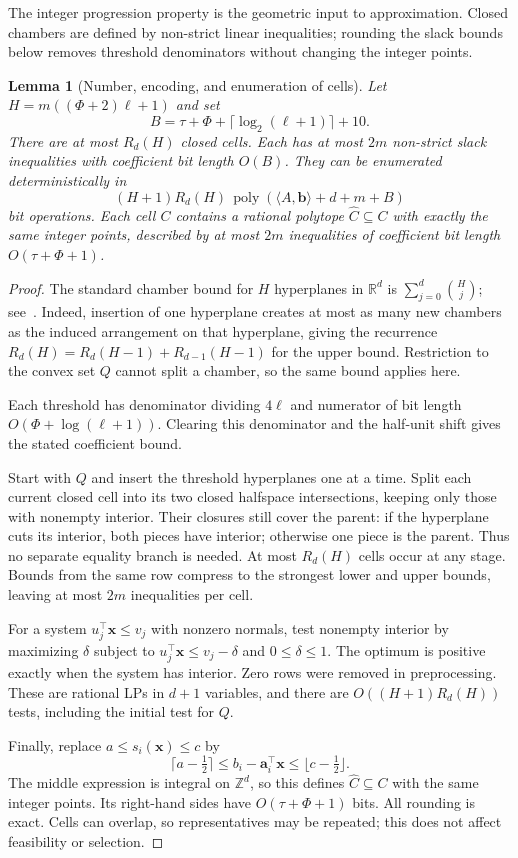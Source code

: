 \documentclass[11pt]{article}
\newtheorem{lemma}[theorem]{Lemma}
\theoremstyle{definition}\newtheorem{definition}{Definition}[section]
\theoremstyle{remark}\newtheorem{remark}[theorem]{Remark}
\newcommand{\R}{\mathbb R}\newcommand{\Q}{\mathbb Q}\newcommand{\Z}{\mathbb Z}
\newcommand{\poly}{\operatorname{poly}}
\begin{document}
The integer progression property is the geometric input to approximation. Closed chambers are defined by non-strict linear inequalities; rounding the slack bounds below removes threshold denominators without changing the integer points.

\begin{lemma}[Number, encoding, and enumeration of cells]\label{lem:arrangement}
Let $H=m((\Phi+2)\ell+1)$ and set
\[
 B=\tau+\Phi+\lceil\log_2(\ell+1)\rceil+10.
\]
There are at most $R_d(H)$ closed cells. Each has at most $2m$ non-strict slack inequalities with coefficient bit length $O(B)$. They can be enumerated deterministically in
\begin{equation}\label{eq:arrangement-time}
 (H+1)R_d(H)\,\poly(\langle A,\mathbf b\rangle+d+m+B)
\end{equation}
bit operations. Each cell $C$ contains a rational polytope $\widehat C\subseteq C$ with exactly the same integer points, described by at most $2m$ inequalities of coefficient bit length $O(\tau+\Phi+1)$.
\end{lemma}
\begin{proof}
The standard chamber bound for $H$ hyperplanes in $\R^d$ is $\sum_{j=0}^d\binom Hj$; see~\cite{Stanley}. Indeed, insertion of one hyperplane creates at most as many new chambers as the induced arrangement on that hyperplane, giving the recurrence $R_d(H)=R_d(H-1)+R_{d-1}(H-1)$ for the upper bound. Restriction to the convex set $Q$ cannot split a chamber, so the same bound applies here.

Each threshold has denominator dividing $4\ell$ and numerator of bit length $O(\Phi+\log(\ell+1))$. Clearing this denominator and the half-unit shift gives the stated coefficient bound.

Start with $Q$ and insert the threshold hyperplanes one at a time. Split each current closed cell into its two closed halfspace intersections, keeping only those with nonempty interior. Their closures still cover the parent: if the hyperplane cuts its interior, both pieces have interior; otherwise one piece is the parent. Thus no separate equality branch is needed. At most $R_d(H)$ cells occur at any stage. Bounds from the same row compress to the strongest lower and upper bounds, leaving at most $2m$ inequalities per cell.

For a system $u_j^\top\mathbf{x}\le v_j$ with nonzero normals, test nonempty interior by maximizing $\delta$ subject to $u_j^\top\mathbf{x}\le v_j-\delta$ and $0\le\delta\le1$. The optimum is positive exactly when the system has interior. Zero rows were removed in preprocessing. These are rational LPs in $d+1$ variables, and there are $O((H+1)R_d(H))$ tests, including the initial test for $Q$.

Finally, replace $a\le s_i(\mathbf{x})\le c$ by
\[
 \lceil a-\tfrac12\rceil\le b_i-\mathbf a_i^\top\mathbf{x}
 \le\lfloor c-\tfrac12\rfloor.
\]
The middle expression is integral on $\Z^d$, so this defines $\widehat C\subseteq C$ with the same integer points. Its right-hand sides have $O(\tau+\Phi+1)$ bits. All rounding is exact. Cells can overlap, so representatives may be repeated; this does not affect feasibility or selection.
\end{proof}
\end{document}
